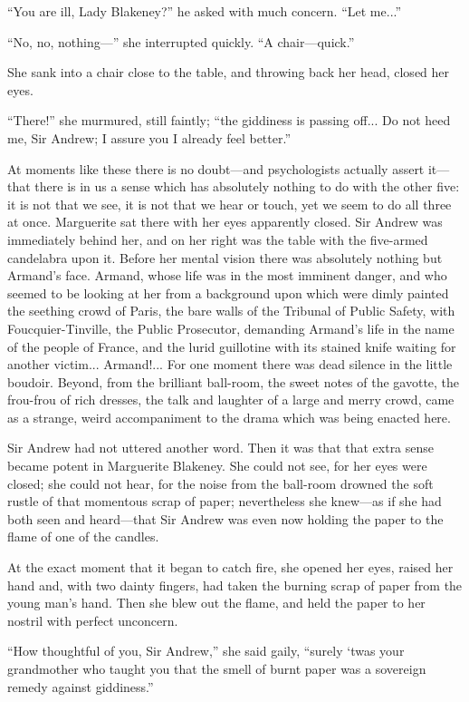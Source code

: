 \documentclass[paper=a5,BCOR=7mm,twoside,DIV=calc,12pt,usegeometry,chapterprefix,endperiod,headings=big]{scrbook}
\begin{document}
\enquote{You are ill, Lady Blakeney?} he asked with much concern. \enquote{Let me...}

\enquote{No, no, nothing---} she interrupted quickly. \enquote{A chair---quick.}

She sank into a chair close to the table, and throwing back her head, closed her eyes.

\enquote{There!} she murmured, still faintly; \enquote{the giddiness is passing off... Do not heed me, Sir Andrew; I assure you I already feel better.}

At moments like these there is no doubt---and psychologists actually assert it---that there is in us a sense which has absolutely nothing to do with the other five: it is not that we see, it is not that we hear or touch, yet we seem to do all three at once. Marguerite sat there with her eyes apparently closed. Sir Andrew was immediately behind her, and on her right was the table with the five-armed candelabra upon it. Before her mental vision there was absolutely nothing but Armand's face. Armand, whose life was in the most imminent danger, and who seemed to be looking at her from a background upon which were dimly painted the seething crowd of Paris, the bare walls of the Tribunal of Public Safety, with Foucquier-Tinville, the Public Prosecutor, demanding Armand's life in the name of the people of France, and the lurid guillotine with its stained knife waiting for another victim... Armand!... For one moment there was dead silence in the little boudoir. Beyond, from the brilliant ball-room, the sweet notes of the gavotte, the frou-frou of rich dresses, the talk and laughter of a large and merry crowd, came as a strange, weird accompaniment to the drama which was being enacted here.

Sir Andrew had not uttered another word. Then it was that that extra sense became potent in Marguerite Blakeney. She could not see, for her eyes were closed; she could not hear, for the noise from the ball-room drowned the soft rustle of that momentous scrap of paper; nevertheless she knew---as if she had both seen and heard---that Sir Andrew was even now holding the paper to the flame of one of the candles.

At the exact moment that it began to catch fire, she opened her eyes, raised her hand and, with two dainty fingers, had taken the burning scrap of paper from the young man's hand. Then she blew out the flame, and held the paper to her nostril with perfect unconcern.

\enquote{How thoughtful of you, Sir Andrew,} she said gaily, \enquote{surely `twas your grandmother who taught you that the smell of burnt paper was a sovereign remedy against giddiness.}
\end{document}
